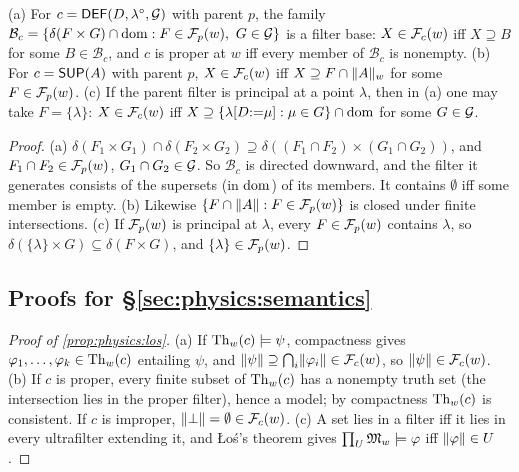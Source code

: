 \begin{lemma}\label{lem:physics:base}
\textup{(a)} For $c=\mathsf{DEF}(D,\lambda^\circ,\mathcal{G})$ with parent $p$, the family
$\mathcal B_c=\{\delta(F\times G)\cap\operatorname{dom}:F\in\mathcal{F}_p(w),\ G\in\mathcal{G}\}$ is a filter base:
$X\in\mathcal{F}_c(w)$ iff $X\supseteq B$ for some $B\in\mathcal B_c$, and $c$ is proper at $w$
iff every member of $\mathcal B_c$ is nonempty.
\textup{(b)} For $c=\mathsf{SUP}(A)$ with parent $p$, $X\in\mathcal{F}_c(w)$ iff $X\supseteq F\cap\lVert A\rVert_w$
for some $F\in\mathcal{F}_p(w)$.
\textup{(c)} If the parent filter is principal at a point $\lambda$, then in (a) one may
take $F=\{\lambda\}$: $X\in\mathcal{F}_c(w)$ iff $X\supseteq\{\lambda[D{:=}\mu]:\mu\in G\}\cap\operatorname{dom}$
for some $G\in\mathcal{G}$.
\end{lemma}
\begin{proof}
(a) $\delta(F_1\times G_1)\cap\delta(F_2\times G_2)\supseteq\delta((F_1\cap F_2)\times(G_1\cap G_2))$,
and $F_1\cap F_2\in\mathcal{F}_p(w)$, $G_1\cap G_2\in\mathcal{G}$. So $\mathcal B_c$ is directed downward,
and the filter it generates consists of the supersets (in $\operatorname{dom}$) of its members. It
contains $\emptyset$ iff some member is empty. (b) Likewise $\{F\cap\lVert A\rVert:F\in\mathcal{F}_p(w)\}$
is closed under finite intersections. (c) If $\mathcal{F}_p(w)$ is principal at $\lambda$, every
$F\in\mathcal{F}_p(w)$ contains $\lambda$, so $\delta(\{\lambda\}\times G)\subseteq\delta(F\times G)$,
and $\{\lambda\}\in\mathcal{F}_p(w)$.
\end{proof}

\subsection{Proofs for \S\ref{sec:physics:semantics}}

\begin{proof}[Proof of \cref{prop:physics:los}]
(a) If $\mathrm{Th}_w(c)\models\psi$, compactness gives $\varphi_1,\dots,\varphi_k\in\mathrm{Th}_w(c)$
entailing $\psi$, and $\lVert \psi\rVert\supseteq\bigcap_i\lVert \varphi_i\rVert\in\mathcal{F}_c(w)$, so
$\lVert \psi\rVert\in\mathcal{F}_c(w)$. (b) If $c$ is proper, every finite subset of $\mathrm{Th}_w(c)$ has a
nonempty truth set (the intersection lies in the proper filter), hence a model; by
compactness $\mathrm{Th}_w(c)$ is consistent. If $c$ is improper, $\lVert \bot\rVert=\emptyset\in\mathcal{F}_c(w)$.
(c) A set lies in a filter iff it lies in every ultrafilter extending it, and \L{}o\'s's
theorem \citep{los1955quelques} gives $\prod_U\mathfrak{M}_w\models\varphi$ iff $\lVert \varphi\rVert\in U$.
\end{proof}

